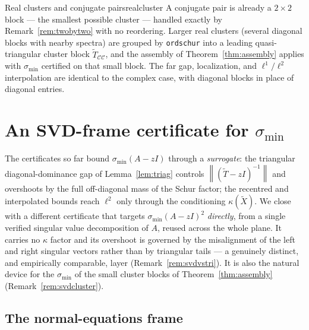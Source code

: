 \documentclass[11pt, a4paper]{article}
\numberwithin{equation}{section}
\newcommand{\norm}[1]{\left\|#1\right\|}
\newcommand{\tX}{\widetilde{X}}
\newcommand{\tT}{\widetilde{T}}
\begin{document}
\begin{remark}{Real clusters and conjugate pairs}{realcluster}
  A conjugate pair is already a $2\times 2$ block --- the smallest possible
  cluster --- handled exactly by Remark~\ref{rem:twobytwo} with no reordering.
  Larger real clusters (several diagonal blocks with nearby spectra) are grouped
  by \texttt{ordschur} into a leading quasi-triangular cluster block
  $\tT_{\mathcal{C}\mathcal{C}}$, and the assembly of
  Theorem~\ref{thm:assembly} applies with $\sigma_{\min}$ certified on that
  small block.  The far gap, localization, and
  $\ell^1/\ell^2$ interpolation are identical to the complex case, with diagonal
  blocks in place of diagonal entries.
\end{remark}

\section{An SVD-frame certificate for $\sigma_{\min}$}
\label{sec:svdframe}

The certificates so far bound $\sigma_{\min}(A - zI)$ through a \emph{surrogate}:
the triangular diagonal-dominance gap of Lemma~\ref{lem:triag} controls
$\norm{(\tT - zI)^{-1}}$ and overshoots by the full off-diagonal mass of the
Schur factor; the recentred and interpolated bounds reach $\ell^2$ only through
the conditioning $\kappa(\tX)$.  We close with a different certificate that
targets $\sigma_{\min}(A - zI)^2$ \emph{directly}, from a single verified
singular value decomposition of $A$, reused across the whole plane.  It carries
no $\kappa$ factor and its overshoot is governed by the misalignment of the left
and right singular vectors rather than by triangular tails --- a genuinely
distinct, and empirically comparable, layer (Remark~\ref{rem:svdvstri}).  It is
also the natural device for the $\sigma_{\min}$ of the small cluster blocks of
Theorem~\ref{thm:assembly} (Remark~\ref{rem:svdcluster}).

\subsection{The normal-equations frame}
\end{document}
